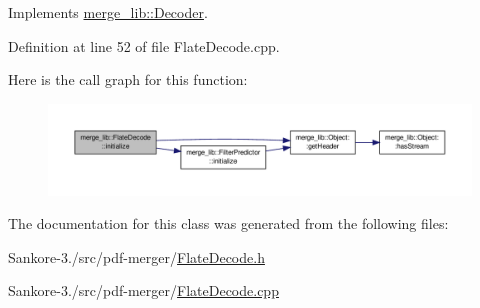 Implements \hyperlink{classmerge__lib_1_1_decoder_a22e3ea6d6dd067c7641acf3dd00659e3}{merge\-\_\-lib\-::\-Decoder}.



Definition at line 52 of file Flate\-Decode.\-cpp.



Here is the call graph for this function\-:
\nopagebreak
\begin{figure}[H]
\begin{center}
\leavevmode
\includegraphics[width=350pt]{d3/d04/classmerge__lib_1_1_flate_decode_ae0644a898654752cf5f8cd2d27d806ca_cgraph}
\end{center}
\end{figure}




The documentation for this class was generated from the following files\-:\begin{DoxyCompactItemize}
\item 
Sankore-\/3./src/pdf-\/merger/\hyperlink{_flate_decode_8h}{Flate\-Decode.\-h}\item 
Sankore-\/3./src/pdf-\/merger/\hyperlink{_flate_decode_8cpp}{Flate\-Decode.\-cpp}\end{DoxyCompactItemize}

